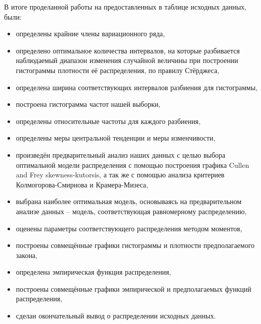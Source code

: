 \documentclass[14pt,a4paper]{scrartcl}
\begin{document}
В итоге проделанной работы на предоставленных в таблице исходных данных, были:
\begin{itemize}
	\item определены крайние члены вариационного ряда,
	\item определено оптимальное количества интервалов, на которые разбивается наблюдаемый диапазон изменения случайной величины при построении гистограммы плотности её распределения, по правилу Стёрджеса,
	\item определена ширина соответствующих интервалов разбиения для гистограммы,
	\item построена гистограмма частот нашей выборки,
	\item определены относительные частоты для каждого разбиения,
	\item определены меры центральной тенденции и меры изменчивости,
	\item произведён предварительный анализ наших данных с целью выбора оптимальной модели распределения с помощью построения графика Cullen and Frey skewness-kutorsis, а так же с помощью анализа критериев Колмогорова-Смирнова и Крамера-Мизеса,
	\item выбрана наиболее оптимальная модель, основываясь на предварительном анализе данных -- модель, соответствующая равномерному распределению,
	\item оценены параметры соответствующего распределения методом моментов,
	\item построены совмещённые графики гистограммы и плотности предполагаемого закона,
	\item определена эмпирическая функция распределения,
	\item построены совмещённые графики эмпирической и предполагаемых функций распределения,
	\item сделан окончательный вывод о распределении исходных данных.
\end{itemize}
\end{document}
